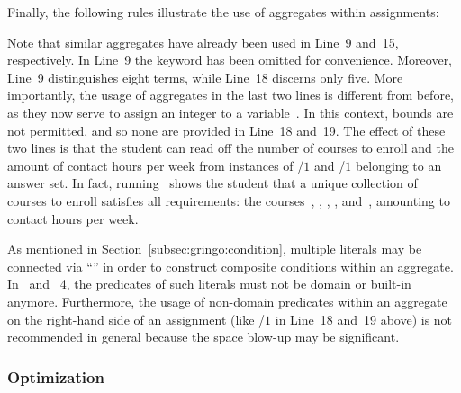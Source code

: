 \begin{example}
Finally, the following rules illustrate the use of aggregates within assignments:
%

%
Note that similar aggregates have already been used in Line~9 and~15, respectively.
In Line~9 the keyword  has been omitted for convenience.
Moreover, Line~9 distinguishes eight terms, while Line~18 discerns only five.
More importantly, the usage of aggregates in the last two lines is different from before,
as they now serve to assign an integer to a variable~.
In this context, bounds are not permitted, and so none are provided in Line~18 and~19.
The effect of these two lines is that the student can read off the number of
courses to enroll and the amount of contact hours per week from instances of
/$1$ and /$1$ belonging to an answer set.%
%
In fact, running \clasp\ shows the student that a unique
collection of~ courses to enroll satisfies all requirements:
the courses~, , , , and~,
amounting to~ contact hours per week.

As mentioned in Section~\ref{subsec:gringo:condition},
multiple literals may be connected via ``\code{,}'' in order to construct
composite conditions within an aggregate.
In \gringo\ and \clingo~4,
the predicates of such literals must not be domain or built-in anymore.
Furthermore, the usage of non-domain predicates within an aggregate
on the right-hand side of an assignment (like /$1$ in Line~18 and~19 above)
is not recommended in general because the space blow-up may be significant.
\eexample
\end{example}


\subsubsection{Optimization}\label{subsec:gringo:optimize}

